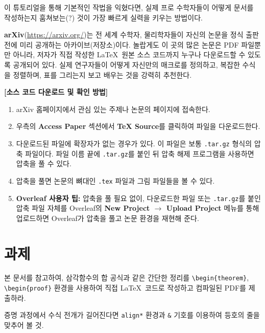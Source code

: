 \documentclass[11pt, a4paper]{article}
\theoremstyle{plain}
\newtheorem{theorem}{정리}[section]      %
\theoremstyle{definition}
\theoremstyle{remark}
\begin{document}
이 튜토리얼을 통해 기본적인 작법을 익혔다면, 실제 프로 수학자들이 어떻게 문서를 작성하는지 훔쳐보는(?) 것이 가장 빠르게 실력을 키우는 방법이다.

\textbf{arXiv}(\url{https://arxiv.org/})는 전 세계 수학자, 물리학자들이 자신의 논문을 정식 출판 전에 미리 공개하는 아카이브(저장소)이다. 놀랍게도 이 곳의 많은 논문은 PDF 파일뿐만 아니라, 저자가 직접 작성한 \LaTeX\ 원본 소스 코드까지 누구나 다운로드할 수 있도록 공개되어 있다. 실제 연구자들이 어떻게 자신만의 매크로를 정의하고, 복잡한 수식을 정렬하며, 표를 그리는지 보고 배우는 것을 강력히 추천한다.

\bigskip

\noindent
\textbf{[소스 코드 다운로드 및 확인 방법]}
\begin{enumerate}
    \item arXiv 홈페이지에서 관심 있는 주제나 논문의 페이지에 접속한다.
    \item 우측의 \textbf{Access Paper} 섹션에서 \textbf{TeX Source}를 클릭하여 파일을 다운로드한다.
    \item 다운로드된 파일에 확장자가 없는 경우가 있다.
    이 파일은 보통 \verb|.tar.gz| 형식의 압축 파일이다.
    파일 이름 끝에 \verb|.tar.gz|를 붙인 뒤 압축 해제 프로그램을 사용하면 압축을 풀 수 있다.
    \item 압축을 풀면 논문의 뼈대인 \verb|.tex| 파일과 그림 파일들을 볼 수 있다.
    \item \textbf{Overleaf 사용자 팁:}
    압축을 풀 필요 없이, 다운로드한 파일 또는 \verb|.tar.gz|를 붙인 압축 파일 자체를
    Overleaf의 \textbf{New Project $\rightarrow$ Upload Project} 메뉴를 통해 업로드하면
    Overleaf가 압축을 풀고 논문 환경을 재현해 준다.
\end{enumerate}

\section{과제}

 본 문서를 참고하여,
삼각함수의 합 공식과 같은 간단한 정리를
\verb|\begin{theorem}|, \verb|\begin{proof}| 환경을 사용하여
직접 \LaTeX\ 코드로 작성하고 컴파일된 PDF를 제출하라.

증명 과정에서 수식 전개가 길어진다면
\verb|align*| 환경과 \verb|&| 기호를 이용하여
등호의 줄을 맞추어 볼 것.
\end{document}

